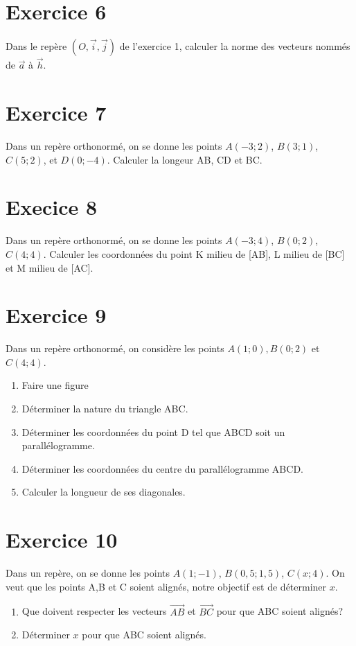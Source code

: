 \documentclass[french]{article}
\begin{document}
\section*{Exercice 6}
Dans le repère $(O,\overrightarrow{i},\overrightarrow{j})$ de l'exercice 1, calculer la norme des vecteurs nommés de $\overrightarrow{a}$ à $\overrightarrow{h}$.

\section*{Exercice 7}
Dans un repère orthonormé, on se donne les points $A(	-3;2)$, $B(3;1)$, $C(5;2)$, et $D(0;-4)$. Calculer la longeur AB, CD et BC.


\section*{Execice 8}
Dans un repère orthonormé, on se donne les points $A(	-3;4)$, $B(0;2)$, $C(4;4)$. Calculer les coordonnées du point K milieu de [AB], L milieu de [BC] et M milieu de [AC].

\section*{Exercice 9}
Dans un repère orthonormé, on considère les points $A(1;0), B(0;2)$ et $C(4;4)$. 
\begin{enumerate}
\item Faire une figure
\item Déterminer la nature du triangle ABC.
\item Déterminer les coordonnées du point D tel que ABCD soit un parallélogramme.
\item Déterminer les coordonnées du centre du parallélogramme ABCD.
\item Calculer la longueur de ses diagonales.
\end{enumerate}

\section*{Exercice 10}
Dans un repère, on se donne les points $A(1;-1)$, $B(0,5;1,5)$, $C(x;4)$. On veut que les points A,B et C soient alignés, notre objectif est de déterminer $x$.
\begin{enumerate}
\item Que doivent respecter les vecteurs $\overrightarrow{AB}$ et $\overrightarrow{BC}$ pour que ABC soient alignés?
\item Déterminer $x$ pour que ABC soient alignés.
\end{enumerate}
\end{document}
